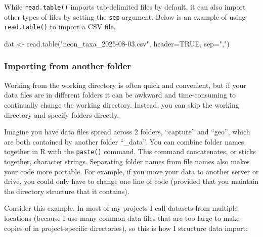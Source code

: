 \documentclass[
  13,
  letterpaper,
]{report}
\newenvironment{Shaded}{\begin{snugshade}}{\end{snugshade}}
\newcommand{\AttributeTok}[1]{\textcolor[rgb]{0.40,0.45,0.13}{#1}}
\newcommand{\ConstantTok}[1]{\textcolor[rgb]{0.56,0.35,0.01}{#1}}
\newcommand{\FunctionTok}[1]{\textcolor[rgb]{0.28,0.35,0.67}{#1}}
\newcommand{\NormalTok}[1]{\textcolor[rgb]{0.00,0.23,0.31}{#1}}
\newcommand{\OtherTok}[1]{\textcolor[rgb]{0.00,0.23,0.31}{#1}}
\newcommand{\StringTok}[1]{\textcolor[rgb]{0.13,0.47,0.30}{#1}}
\begin{document}
While \texttt{read.table()} imports tab-delimited files by default, it
can also import other types of files by setting the \texttt{sep}
argument. Below is an example of using \texttt{read.table()} to import a
CSV file.

\begin{Shaded}
\begin{Highlighting}[]
\NormalTok{dat }\OtherTok{\textless{}{-}} \FunctionTok{read.table}\NormalTok{(}\StringTok{"neon\_taxa\_2025{-}08{-}03.csv"}\NormalTok{,}
    \AttributeTok{header=}\ConstantTok{TRUE}\NormalTok{, }\AttributeTok{sep=}\StringTok{","}\NormalTok{)}
\end{Highlighting}
\end{Shaded}

\subsubsection{Importing from another
folder}\label{importing-from-another-folder}

Working from the working directory is often quick and convenient, but if
your data files are in different folders it can be awkward and
time-consuming to continually change the working directory. Instead, you
can skip the working directory and specify folders directly.

Imagine you have data files spread across 2 folders, ``capture'' and
``geo'', which are both contained by another folder ``\_data''. You can
combine folder names together in R with the \texttt{paste()} command.
This command concatenates, or sticks together, character strings.
Separating folder names from file names also makes your code more
portable. For example, if you move your data to another server or drive,
you could only have to change one line of code (provided that you
maintain the directory structure that it contains).

Consider this example. In most of my projects I call datasets from
multiple locations (because I use many common data files that are too
large to make copies of in project-specific directories), so this is how
I structure data import:
\end{document}
